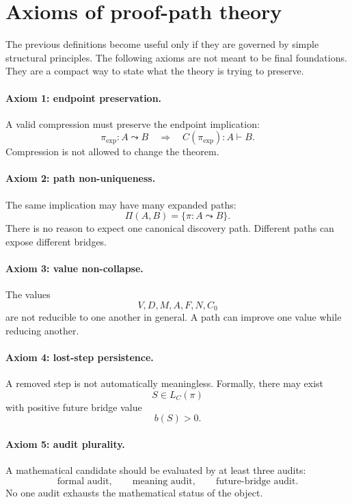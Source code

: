 \documentclass[11pt,oneside]{book}
\theoremstyle{remark}
\begin{document}
\section{Axioms of proof-path theory}

The previous definitions become useful only if they are governed by simple structural principles.  The following axioms are not meant to be final foundations.  They are a compact way to state what the theory is trying to preserve.

\paragraph{Axiom 1: endpoint preservation.}
A valid compression must preserve the endpoint implication:
\[
        \pi_{\mathrm{exp}}:A\leadsto B
        \quad\Longrightarrow\quad
        C(\pi_{\mathrm{exp}}):A\vdash B.
\]
Compression is not allowed to change the theorem.

\paragraph{Axiom 2: path non-uniqueness.}
The same implication may have many expanded paths:
\[
        \Pi(A,B)=\{\pi:A\leadsto B\}.
\]
There is no reason to expect one canonical discovery path.  Different paths can expose different bridges.

\paragraph{Axiom 3: value non-collapse.}
The values
\[
        V,D,M,A,F,N,C_0
\]
are not reducible to one another in general.  A path can improve one value while reducing another.

\paragraph{Axiom 4: lost-step persistence.}
A removed step is not automatically meaningless.  Formally, there may exist
\[
        S\in L_C(\pi)
\]
with positive future bridge value
\[
        b(S)>0.
\]

\paragraph{Axiom 5: audit plurality.}
A mathematical candidate should be evaluated by at least three audits:
\[
        \text{formal audit},\qquad \text{meaning audit},\qquad \text{future-bridge audit}.
\]
No one audit exhausts the mathematical status of the object.
\end{document}
